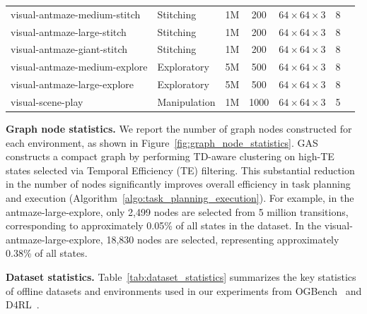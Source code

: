 \documentclass{article}
\begin{document}
\begin{table}[H]
{\begin{tabular}{@{}llccccc@{}}
        visual-antmaze-medium-stitch     & Stitching    & 1M &  200 & $64\!\times\!64\!\times\!3$ & 8 \\
        visual-antmaze-large-stitch      & Stitching    & 1M &  200 & $64\!\times\!64\!\times\!3$ & 8 \\
        visual-antmaze-giant-stitch      & Stitching    & 1M &  200 & $64\!\times\!64\!\times\!3$ & 8 \\
        visual-antmaze-medium-explore    & Exploratory  & 5M &  500 & $64\!\times\!64\!\times\!3$ & 8 \\
        visual-antmaze-large-explore     & Exploratory  & 5M &  500 & $64\!\times\!64\!\times\!3$ & 8 \\
        visual-scene-play                & Manipulation & 1M & 1000 & $64\!\times\!64\!\times\!3$ & 5 \\
        \bottomrule
    \end{tabular}
    }
\end{table}

\vspace{0.5em}

\textbf{Graph node statistics.} We report the number of graph nodes constructed for each environment, as shown in Figure~\ref{fig:graph_node_statistics}. GAS constructs a compact graph by performing TD-aware clustering on high-TE states selected via Temporal Efficiency (TE) filtering. This substantial reduction in the number of nodes significantly improves overall efficiency in task planning and execution (Algorithm~\ref{algo:task_planning_execution}). For example, in the antmaze-large-explore, only 2,499 nodes are selected from 5 million transitions, corresponding to approximately 0.05\% of all states in the dataset. In the visual-antmaze-large-explore, 18,830 nodes are selected, representing approximately 0.38\% of all states.

\vspace{0.5em}

\textbf{Dataset statistics.}
Table~\ref{tab:dataset_statistics} summarizes the key statistics of offline datasets and environments used in our experiments from OGBench~\cite{park2025ogbench} and D4RL~\cite{fu2020d4rl}. 

\vspace{0.5em}
\end{document}
